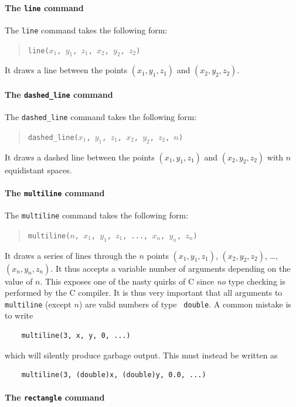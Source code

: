 \paragraph{The {\tt line} command}

The {\tt line} command takes the following form:
\begin{quote}
  \texttt{line($x_1$, $y_1$, $z_1$, $x_2$, $y_2$, $z_2$)}
\end{quote}
It draws a line between the points $(x_1, y_1, z_1)$ and $(x_2, y_2,
z_2)$.

\paragraph{The {\tt dashed\_line} command}

The {\tt dashed\_line} command takes the following form:
\begin{quote}
  \texttt{dashed\_line($x_1$, $y_1$, $z_1$, $x_2$, $y_2$, $z_2$, $n$)}
\end{quote}
It draws a dashed line between the points $(x_1, y_1, z_1)$ and $(x_2, y_2,
z_2)$ with $n$ equidistant spaces.


\paragraph{The {\tt multiline} command}

The {\tt multiline} command takes the following form:
\begin{quote}
  \texttt{multiline($n$, $x_1$, $y_1$, $z_1$, ..., $x_n$, $y_n$, $z_n$)}
\end{quote}
It draws a series of lines through the $n$ points $(x_1, y_1, z_1)$,
$(x_2, y_2, z_2)$, \ldots, $(x_n, y_n, z_n)$. It thus accepts a variable
number of arguments depending on the value of $n$. This exposes
one of the nasty quirks of C since \emph{no} type checking is
performed by the C compiler. It is thus very important that all
arguments to {\tt multiline} (except $n$) are valid numbers of type {\tt
  double}. A common mistake is to write
\begin{verbatim}
    multiline(3, x, y, 0, ...)
\end{verbatim}
which will silently produce garbage output. This must instead be
written as
\begin{verbatim}
    multiline(3, (double)x, (double)y, 0.0, ...)
\end{verbatim}

\paragraph{The {\tt rectangle} command}

